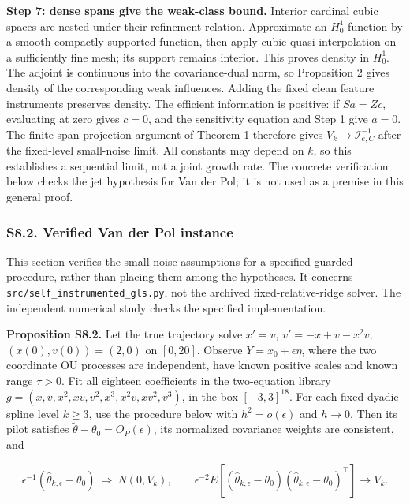 \documentclass[
  american,
  11pt,
]{article}
\begin{document}
\textbf{Step 7: dense spans give the weak-class bound.} Interior
cardinal cubic spaces are nested under their refinement relation.
Approximate an \(H_0^1\) function by a smooth compactly supported
function, then apply cubic quasi-interpolation on a sufficiently fine
mesh; its support remains interior. This proves density in \(H_0^1\).
The adjoint is continuous into the covariance-dual norm, so Proposition
2 gives density of the corresponding weak influences. Adding the fixed
clean feature instruments preserves density. The efficient information
is positive: if \(S a=Z c\), evaluating at zero gives \(c=0\), and the
sensitivity equation and Step 1 give \(a=0\). The finite-span projection
argument of Theorem 1 therefore gives \(V_k\to\mathcal I_{e,C}^{-1}\)
after the fixed-level small-noise limit. All constants may depend on
\(k\), so this establishes a sequential limit, not a joint growth rate.
The concrete verification below checks the jet hypothesis for Van der
Pol; it is not used as a premise in this general proof.

\subsubsection{S8.2. Verified Van der Pol
instance}\label{s8.2.-verified-van-der-pol-instance}

This section verifies the small-noise assumptions for a specified
guarded procedure, rather than placing them among the hypotheses. It
concerns \texttt{src/self\_instrumented\_gls.py}, not the archived
fixed-relative-ridge solver. The independent numerical study checks the
specified implementation.

\textbf{Proposition S8.2.} Let the true trajectory solve \(x'=v\),
\(v'=-x+v-x^2v\), \((x(0),v(0))=(2,0)\) on \([0,20]\). Observe
\(Y=x_0+\epsilon\eta\), where the two coordinate OU processes are
independent, have known positive scales and known range \(\tau>0\). Fit
all eighteen coefficients in the two-equation library
\(g=(x,v,x^2,xv,v^2,x^3,x^2v,xv^2,v^3)\), in the box \([-3,3]^{18}\).
For each fixed dyadic spline level \(k\geq3\), use the procedure below
with \(h^2=o(\epsilon)\) and \(h\to0\). Then its pilot satisfies
\(\widetilde\theta-\theta_0=O_P(\epsilon)\), its normalized covariance
weights are consistent, and

\[
\epsilon^{-1}(\widehat\theta_{k,\epsilon}-\theta_0)
\ \Rightarrow\ N(0,V_k),\qquad
\epsilon^{-2}E[(\widehat\theta_{k,\epsilon}-\theta_0)
(\widehat\theta_{k,\epsilon}-\theta_0)^\top]\to V_k.
\]
\end{document}
